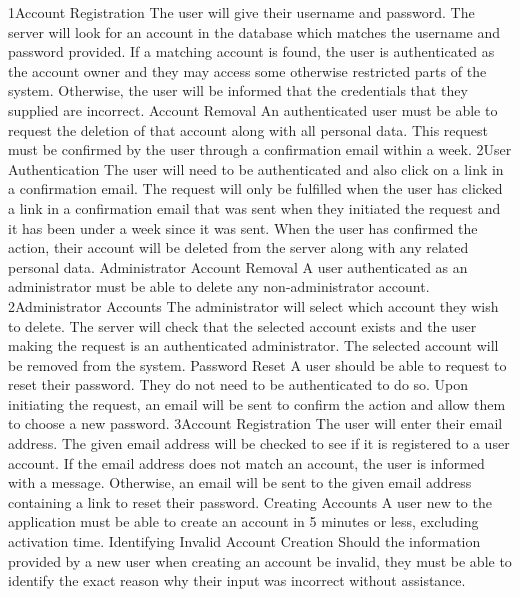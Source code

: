 			{1}{Account Registration}
			{The user will give their username and password.}
			{The server will look for an account in the database which matches
			the username and password provided.}
			{If a matching account is found, the user is authenticated as 
			the account owner and they may access some otherwise restricted 
			parts of the system. Otherwise, the user will be informed that the
			credentials that they supplied are incorrect.}
		\funcreq
			{Account Removal}
			{An authenticated user must be able to request the deletion of 
			that account along with all personal data. This request must be 
			confirmed by the user through a confirmation email within a week.}
			{2}{User Authentication}
			{The user will need to be authenticated and also click on a link 
			in a confirmation email.}
			{The request will only be fulfilled when the user has clicked a 
			link in a confirmation email that was sent when they initiated the 
			request and it has been under a week since it was sent.}
			{When the user has confirmed the action, their account will be 
			deleted from the server along with any related personal data.}
		\funcreq
			{Administrator Account Removal}
			{A user authenticated as an administrator must be able to delete
			any non-administrator account.}
			{2}{Administrator Accounts}
			{The administrator will select which account they wish to delete.}
			{The server will check that the selected account exists and the
			user making the request is an authenticated administrator.}
			{The selected account will be removed from the system.}
		\funcreq
			{Password Reset}
			{A user should be able to request to reset their password. They do
			not need to be authenticated to do so. Upon initiating the request,
			an email will be sent to confirm the action and allow them to 
			choose a new password.}
			{3}{Account Registration}
			{The user will enter their email address.}
			{The given email address will be checked to see if it is 
			registered to a user account.}
			{If the email address does not match an account, the user is
			informed with a message. Otherwise, an email will be sent to the
			given email address containing a link to reset their password.}
		\nonfuncreq
			{Creating Accounts}
			{A user new to the application must be able to create an account in 
			5 minutes or less, excluding activation time.}
		\nonfuncreq
			{Identifying Invalid Account Creation}
			{Should the information provided by a new user when creating an
			account be invalid, they must be able to identify the exact reason
			why their input was incorrect without assistance.}
